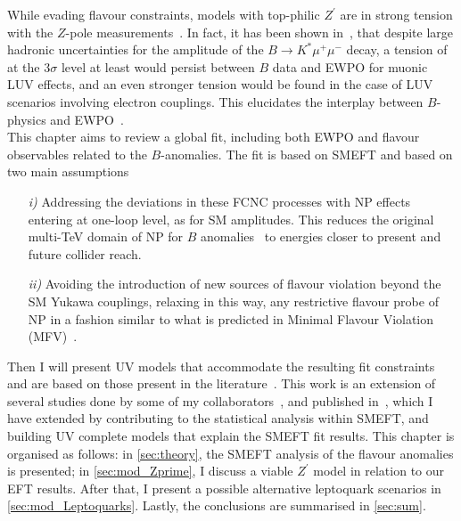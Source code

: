 While evading flavour constraints, models with top-philic $Z^\prime$ are in strong tension with the $Z$-pole measurements~\cite{Camargo-Molina:2018cwu,Efrati:2015eaa}. In fact, it has been shown in~\cite{Ciuchini:2019usw}, that despite large hadronic uncertainties for the amplitude of the $B \to K^{*} \mu^{+} \mu^{-}$ decay, a tension of at the 3$\sigma$ level at least would persist between $B$ data and EWPO for muonic LUV effects, and an even stronger tension would be found in the case of LUV scenarios involving electron couplings. This elucidates the interplay between $B$-physics and EWPO~\cite{Bhattacharya:2014wla,Feruglio:2016gvd,Celis:2017doq,Buttazzo:2017ixm,Kumar:2018kmr,Ciuchini:2019usw,Aebischer:2019mlg,Cornella:2019hct}. \\
This chapter aims to review a global fit, including both EWPO and flavour observables related to the $B$-anomalies. The fit is based on SMEFT and based on two main assumptions
\begin{itemize}
	\item[\textit{i)}] Addressing the deviations in these FCNC processes with NP effects entering at one-loop level, as for SM amplitudes. This reduces the original multi-TeV domain of NP for $B$ anomalies~\cite{DiLuzio:2017chi} to energies closer to present and future collider reach.
	\item[\textit{ii)}] Avoiding the introduction of new sources of flavour violation beyond the SM Yukawa couplings, relaxing in this way, any restrictive flavour probe of NP {in a fashion similar to what is predicted in Minimal Flavour Violation (MFV)~\cite{Buras:2000dm,DAmbrosio:2002vsn,Kagan:2009bn}.}
\end{itemize}
 Then I will present UV models that accommodate the resulting fit constraints and are based on those present in the literature~\cite{Kamenik:2017tnu,Fox:2018ldq,Celis:2017doq}. This work is an extension of several studies done by some of my collaborators~\cite{Ciuchini:2015qxb,Ciuchini:2016weo,Ciuchini:2017mik,Ciuchini:2017gva,Ciuchini:2018xll,Ciuchini:2018anp,Ciuchini:2019usw}, and published in~\cite{Alasfar:2020mne}, which I have extended by contributing to the statistical analysis within SMEFT, and building UV complete models that explain the SMEFT fit results. 
This chapter is organised as follows: in \autoref{sec:theory}, the SMEFT analysis of the flavour anomalies is presented; in \autoref{sec:mod_Zprime}, I discuss a viable $Z^{\prime}$ model in relation to our EFT results. After that, I present a possible alternative leptoquark scenarios in~ \autoref{sec:mod_Leptoquarks}. Lastly, the conclusions are summarised in \autoref{sec:sum}.
